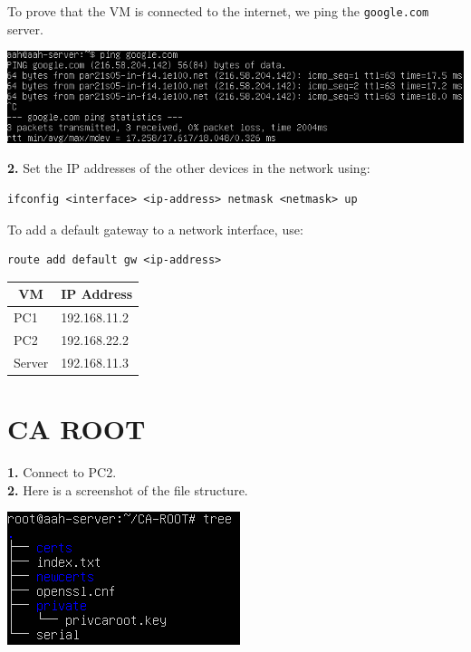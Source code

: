 \documentclass[12pt]{extarticle}
\begin{document}
To prove that the VM is connected to the internet, we ping the \texttt{google.com} server.
\begin{center}
\includegraphics[scale=0.5]{resources/1-1-3.png}\\
\end{center}

\textbf{2.} 
Set the IP addresses of the other devices in the network using:
\begin{verbatim}
ifconfig <interface> <ip-address> netmask <netmask> up
\end{verbatim}
To add a default gateway to a network interface, use:
\begin{verbatim}
route add default gw <ip-address>
\end{verbatim}
\begin{table}[H]
\begin{tabular}{|l|l|}
\hline
\multicolumn{1}{|c|}{\textbf{VM}} & \multicolumn{1}{c|}{\textbf{IP Address}} \\ \hline
PC1                               & 192.168.11.2                             \\ \hline
PC2                               & 192.168.22.2                             \\ \hline
Server                            & 192.168.11.3                             \\ \hline
\end{tabular}
\end{table}

\section{CA ROOT}
\textbf{1.} Connect to PC2.\\

\textbf{2.} Here is a screenshot of the file structure.
\begin{center}
\includegraphics[scale=0.7]{resources/2-2-1.png}\\
\end{center}
\end{document}
